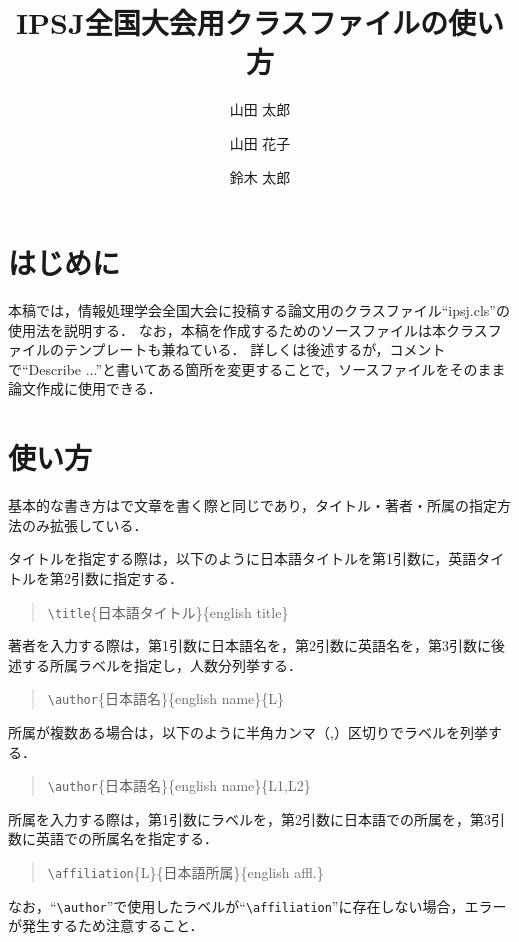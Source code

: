 \documentclass[lualatex]{ipsj}
\title
  {IPSJ全国大会用クラスファイルの使い方}
  {How to use the class file for the national convention of IPSJ}
\author{山田 太郎}{Tarou Yamada}{IE}
\author{山田 花子}{Hanako Yamada}{I}
\author{鈴木 太郎}{Tarou Suzuki}{I,IS}
\affiliation{IE}
  {名古屋大学工学部電気電子・情報工学科}
  {Department of Information Engineering, School of Engineering, Nagoya University}
\affiliation{I}
  {名古屋大学大学院情報学研究科}
  {Graduate School of Informatics, Nagoya University}
\affiliation{IS}
  {名古屋大学大学院情報科学研究科}
  {Graduate School of Information Science, Nagoya University}
\begin{document}
\maketitle

\section{はじめに}
本稿では，情報処理学会全国大会に投稿する論文用のクラスファイル``ipsj.cls''の使用法を説明する．
なお，本稿を作成するためのソースファイルは本クラスファイルのテンプレートも兼ねている．
詳しくは後述するが，コメントで``Describe ...''と書いてある箇所を変更することで，ソースファイルをそのまま論文作成に使用できる．


\section{使い方}
基本的な書き方は{\LaTeXe}で文章を書く際と同じであり，タイトル・著者・所属の指定方法のみ拡張している．

タイトルを指定する際は，以下のように日本語タイトルを第1引数に，英語タイトルを第2引数に指定する．
  \begin{quote}
  \texttt{\textbackslash title}\{日本語タイトル\}\{english title\}
  \end{quote}

著者を入力する際は，第1引数に日本語名を，第2引数に英語名を，第3引数に後述する所属ラベルを指定し，人数分列挙する．
  \begin{quote}
  \texttt{\textbackslash author}\{日本語名\}\{english name\}\{L\}
  \end{quote}
所属が複数ある場合は，以下のように半角カンマ（,）区切りでラベルを列挙する．
  \begin{quote}
  \texttt{\textbackslash author}\{日本語名\}\{english name\}\{L1,L2\}
  \end{quote}

所属を入力する際は，第1引数にラベルを，第2引数に日本語での所属を，第3引数に英語での所属名を指定する．
  \begin{quote}
  \texttt{\textbackslash affiliation}\{L\}\{日本語所属\}\{english affl.\}
  \end{quote}
なお，``\texttt{\textbackslash author}''で使用したラベルが``\texttt{\textbackslash affiliation}''に存在しない場合，エラーが発生するため注意すること．
\end{document}
